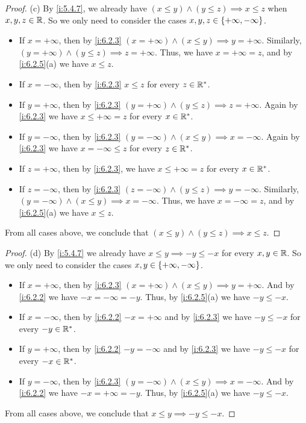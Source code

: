 \begin{proof}{(c)}
  By \cref{i:5.4.7}, we already have \((x \leq y) \land (y \leq z) \implies x \leq z\) when \(x, y, z \in \mathbb{R}\).
  So we only need to consider the cases \(x, y, z \in \left\lbrace+\infty, -\infty\right\rbrace\).
  \begin{itemize}
    \item If \(x = +\infty\), then by \cref{i:6.2.3} \((x = +\infty) \land (x \leq y) \implies y = +\infty\).
          Similarly, \((y = +\infty) \land (y \leq z) \implies z = +\infty\).
          Thus, we have \(x = +\infty = z\), and by \cref{i:6.2.5}(a) we have \(x \leq z\).
    \item If \(x = -\infty\), then by \cref{i:6.2.3} \(x \leq z \) for every \(z \in \mathbb{R}^*\).
    \item If \(y = +\infty\), then by \cref{i:6.2.3} \((y = +\infty) \land (y \leq z) \implies z = +\infty\).
          Again by \cref{i:6.2.3} we have \(x \leq +\infty = z\) for every \(x \in \mathbb{R}^*\).
    \item If \(y = -\infty\), then by \cref{i:6.2.3} \((y = -\infty) \land (x \leq y) \implies x = -\infty\).
          Again by \cref{i:6.2.3} we have \(x = -\infty \leq z\) for every \(z \in \mathbb{R}^*\).
    \item If \(z = +\infty\), then by \cref{i:6.2.3}, we have \(x \leq +\infty = z\) for every \(x \in \mathbb{R}^*\).
    \item If \(z = -\infty\), then by \cref{i:6.2.3} \((z = -\infty) \land (y \leq z) \implies y = -\infty\).
          Similarly, \((y = -\infty) \land (x \leq y) \implies x = -\infty\).
          Thus, we have \(x = -\infty = z\), and by \cref{i:6.2.5}(a) we have \(x \leq z\).
  \end{itemize}
  From all cases above, we conclude that \((x \leq y) \land (y \leq z) \implies x \leq z\).
\end{proof}

\begin{proof}{(d)}
  By \cref{i:5.4.7} we already have \(x \leq y \implies -y \leq -x\) for every \(x, y \in \mathbb{R}\).
  So we only need to consider the cases \(x, y \in \left\lbrace+\infty, -\infty\right\rbrace\).
  \begin{itemize}
    \item If \(x = +\infty\), then by \cref{i:6.2.3} \((x = +\infty) \land (x \leq y) \implies y = +\infty\).
          And by \cref{i:6.2.2} we have \(-x = -\infty = -y\).
          Thus, by \cref{i:6.2.5}(a) we have \(-y \leq -x\).
    \item If \(x = -\infty\), then by \cref{i:6.2.2} \(-x = +\infty\) and by \cref{i:6.2.3} we have \(-y \leq -x\) for every \(-y \in \mathbb{R}^*\).
    \item If \(y = +\infty\), then by \cref{i:6.2.2} \(-y = -\infty\) and by \cref{i:6.2.3} we have \(-y \leq -x\) for every \(-x \in \mathbb{R}^*\).
    \item If \(y = -\infty\), then by \cref{i:6.2.3} \((y = -\infty) \land (x \leq y) \implies x = -\infty\).
          And by \cref{i:6.2.2} we have \(-x = +\infty = -y\).
          Thus, by \cref{i:6.2.5}(a) we have \(-y \leq -x\).
  \end{itemize}
  From all cases above, we conclude that \(x \leq y \implies -y \leq -x\).
\end{proof}

